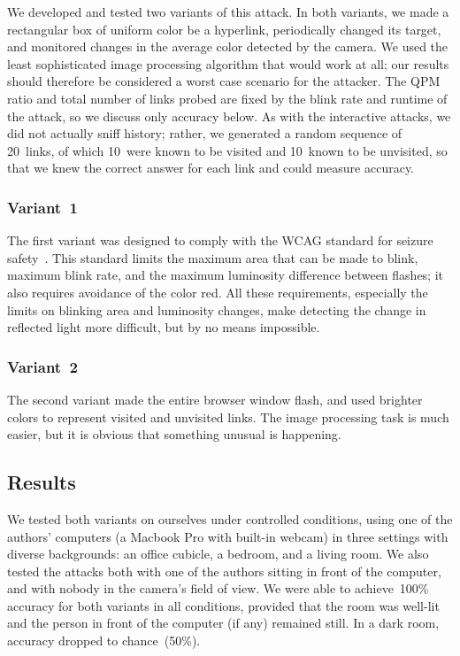 \documentclass[conference]{IEEEtran}
\begin{document}
We developed and tested two variants of this attack.  In both
variants, we made a rectangular box of uniform color be a hyperlink,
periodically changed its target, and monitored changes in the average
color detected by the camera.  We used the least sophisticated image
processing algorithm that would work at all; our results should
therefore be considered a worst case scenario for the attacker.  The
QPM ratio and total number of links probed are fixed by the blink rate
and runtime of the attack, so we discuss only accuracy below.  As with
the interactive attacks, we did not actually sniff history; rather, we
generated a random sequence of 20~links, of which 10~were known to be
visited and 10~known to be unvisited, so that we knew the correct
answer for each link and could measure accuracy.

\subsubsection{Variant~1}
The first variant was designed to comply with the WCAG standard for
seizure safety~\cite{wcag}.  This standard limits the maximum area
that can be made to blink, maximum blink rate, and the maximum
luminosity difference between flashes; it also requires avoidance of
the color red.  All these requirements, especially the limits on
blinking area and luminosity changes, make detecting the change in
reflected light more difficult, but by no means impossible.

\subsubsection{Variant~2}
The second variant made the entire browser window flash, and used
brighter colors to represent visited and unvisited links.  The image
processing task is much easier, but it is obvious that something
unusual is happening.

\subsection{Results}
We tested both variants on ourselves under controlled conditions,
using one of the authors' computers (a Macbook Pro with built-in
webcam) in three settings with diverse backgrounds: an office cubicle,
a bedroom, and a living room.  We also tested the attacks both with
one of the authors sitting in front of the computer, and with nobody
in the camera's field of view.  We were able to achieve~100\% accuracy
for both variants in all conditions, provided that the room was
well-lit and the person in front of the computer (if any) remained
still.  In a dark room, accuracy dropped to chance~(50\%).
\end{document}
